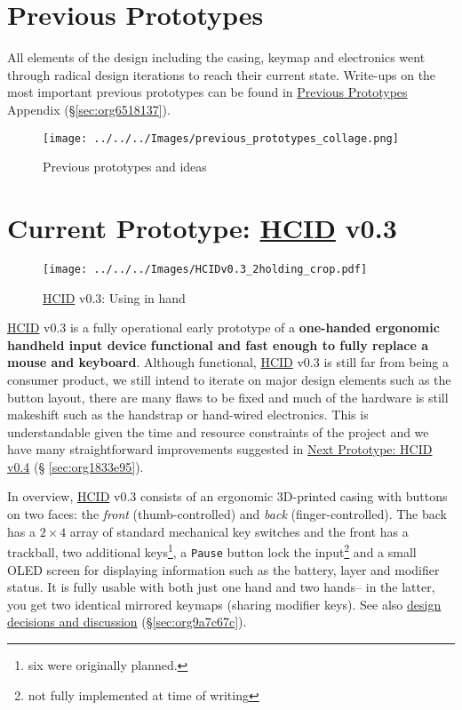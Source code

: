 \documentclass[logo,bsc,singlespacing,parskip]{infthesis}
\begin{document}
\chapter{Previous Prototypes}
\label{sec:org5a3f7ca}
All elements of the design including the casing, keymap and electronics went through radical design iterations to reach their current state.
Write-ups on the most important previous prototypes can be found in \hyperref[sec:org6518137]{Previous Prototypes}  Appendix (\S \ref{sec:org6518137}).

\begin{figure}[h]
\centering
\texttt{[image: ../../../Images/previous\_prototypes\_collage.png]}
\caption{Previous prototypes and ideas}
\end{figure}

\chapter{Current Prototype: \hyperref[orgc00eca5]{HCID} v0.3}
\label{sec:orgd7e9134}
\begin{figure}[h]
\centering
\texttt{[image: ../../../Images/HCIDv0.3\_2holding\_crop.pdf]}
\caption{\hyperref[orgc00eca5]{HCID} v0.3: Using in hand}
\end{figure}

\hyperref[orgc00eca5]{HCID} v0.3 is a fully operational early prototype of a \textbf{one-handed ergonomic handheld input device functional and fast enough to fully replace a mouse and keyboard}.
Although functional, \hyperref[orgc00eca5]{HCID} v0.3 is still far from being a consumer product, we still intend to iterate on major design elements such as the button layout, there are many flaws to be fixed and much of the hardware is still makeshift such as the handstrap or hand-wired electronics.
This is understandable given the time and resource constraints of the project and we have many straightforward improvements suggested in \hyperref[sec:org1833e95]{Next Prototype: HCID v0.4}  (§ \ref{sec:org1833e95}).

In overview, \hyperref[orgc00eca5]{HCID} v0.3 consists of an ergonomic 3D-printed casing with buttons on two faces: the \emph{front} (thumb-controlled) and \emph{back} (finger-controlled).
The back has a \(2\times4\) array of standard mechanical key switches and the front has a trackball, two additional keys\footnote{six were originally planned.}, a \texttt{Pause} button lock the input\footnote{not fully implemented at time of writing} and a small OLED screen for displaying information such as the battery, layer and modifier status.
It is fully usable with both just one hand and two hands-- in the latter, you get two identical mirrored keymaps (sharing modifier keys).
See also \hyperref[sec:org9a7c67c]{design decisions and discussion} (\S \ref{sec:org9a7c67c}).
\end{document}
